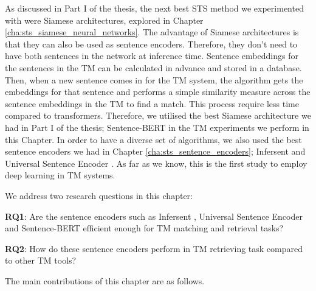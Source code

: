 As discussed in Part I of the thesis, the next best STS method we experimented with were Siamese architectures, explored in Chapter \ref{cha:sts_siamese_neural_networks}. The advantage of Siamese architectures is that they can also be used as sentence encoders. Therefore, they don't need to have both sentences in the network at inference time. Sentence embeddings for the sentences in the TM can be calculated in advance and stored in a database. Then, when a new sentence comes in for the TM system, the algorithm gets the embeddings for that sentence and performs a simple similarity measure across the sentence embeddings in the TM to find a match. This process require less time compared to transformers. Therefore, we utilised the best Siamese architecture we had in Part I of the thesis; Sentence-BERT \autocite{reimers-gurevych-2019-sentence} in the TM experiments we perform in this Chapter. In order to have a diverse set of algorithms, we also used the best sentence encoders we had in Chapter \ref{cha:sts_sentence_encoders}; Infersent \autocite{conneau-EtAl:2017:EMNLP2017} and Universal Sentence Encoder \autocite{cer2018universal}. As far as we know, this is the first study to employ deep learning in TM systems. 

We address two research questions in this chapter:

\textbf{RQ1}: Are the sentence encoders such as Infersent \autocite{conneau-EtAl:2017:EMNLP2017}, Universal Sentence Encoder \autocite{cer2018universal} and Sentence-BERT \autocite{reimers-gurevych-2019-sentence} efficient enough for TM matching and retrieval tasks?

\textbf{RQ2}: How do these sentence encoders perform in TM retrieving task compared to other TM tools?

The main contributions of this chapter are as follows.

